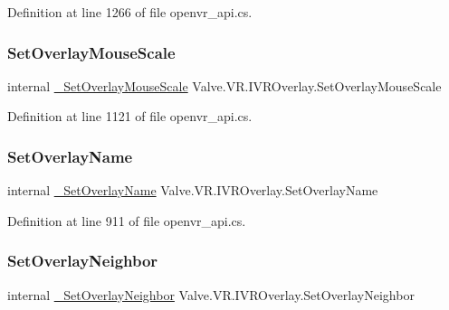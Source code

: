 Definition at line 1266 of file openvr\+\_\+api.\+cs.

\mbox{\label{struct_valve_1_1_v_r_1_1_i_v_r_overlay_a01b661fbcd161d5949cd5f4784219f8a}} 
\subsubsection{\texorpdfstring{SetOverlayMouseScale}{SetOverlayMouseScale}}
{\footnotesize\ttfamily internal \mbox{\hyperlink{struct_valve_1_1_v_r_1_1_i_v_r_overlay_a754c67b5ba2654c82e4f4e066d87af9f}{\+\_\+\+Set\+Overlay\+Mouse\+Scale}} Valve.\+V\+R.\+I\+V\+R\+Overlay.\+Set\+Overlay\+Mouse\+Scale}



Definition at line 1121 of file openvr\+\_\+api.\+cs.

\mbox{\label{struct_valve_1_1_v_r_1_1_i_v_r_overlay_abe1b3f3615b5378036f80e868fbf86a7}} 
\subsubsection{\texorpdfstring{SetOverlayName}{SetOverlayName}}
{\footnotesize\ttfamily internal \mbox{\hyperlink{struct_valve_1_1_v_r_1_1_i_v_r_overlay_a465fcf8a1450d69d7e1e4f26117069fe}{\+\_\+\+Set\+Overlay\+Name}} Valve.\+V\+R.\+I\+V\+R\+Overlay.\+Set\+Overlay\+Name}



Definition at line 911 of file openvr\+\_\+api.\+cs.

\mbox{\label{struct_valve_1_1_v_r_1_1_i_v_r_overlay_ac73240b2e6ad8d31a4c45763453cdc62}} 
\subsubsection{\texorpdfstring{SetOverlayNeighbor}{SetOverlayNeighbor}}
{\footnotesize\ttfamily internal \mbox{\hyperlink{struct_valve_1_1_v_r_1_1_i_v_r_overlay_ac035a5a1c1aacd145f1268c402e3fe3d}{\+\_\+\+Set\+Overlay\+Neighbor}} Valve.\+V\+R.\+I\+V\+R\+Overlay.\+Set\+Overlay\+Neighbor}



